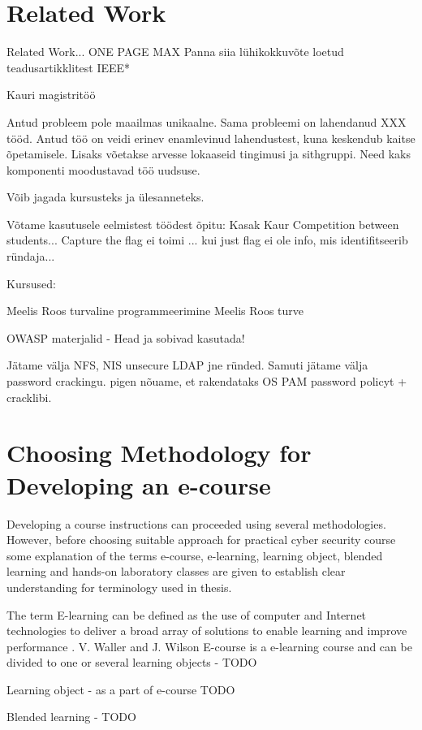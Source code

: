\section{Related Work}
\label{Related Work}
Related Work...
ONE PAGE MAX
Panna siia lühikokkuvõte loetud teadusartikklitest IEEE*

Kauri magistritöö

Antud probleem pole maailmas unikaalne. Sama probleemi on lahendanud XXX tööd. Antud töö on veidi erinev enamlevinud lahendustest, kuna keskendub kaitse õpetamisele. Lisaks võetakse arvesse lokaaseid tingimusi ja sithgruppi. Need kaks komponenti moodustavad töö uudsuse.

Võib jagada kursusteks ja ülesanneteks.

Võtame kasutusele eelmistest töödest õpitu:
Kasak Kaur \citep{KasakKaur}
Competition between students...
Capture the flag ei toimi ... kui just flag ei ole info, mis identifitseerib ründaja...

Kursused:

Meelis Roos turvaline programmeerimine
Meelis Roos turve 

OWASP materjalid - Head ja sobivad kasutada!

Jätame välja NFS, NIS unsecure LDAP jne ründed.
Samuti jätame välja password crackingu. pigen nõuame, et rakendataks OS PAM password policyt + cracklibi.


\section{Choosing Methodology for Developing an e-course}

Developing a course instructions can proceeded using several methodologies. However, before choosing suitable approach for practical cyber security course some explanation of the terms e-course, e-learning, learning object, blended learning and hands-on laboratory classes are given to establish clear understanding for terminology used in thesis.

The term E-learning can be defined as the use of computer and Internet technologies to deliver a broad array of solutions to enable learning and improve performance \cite[p.~3]{food2011learning}.
V. Waller and J. Wilson 
E-course is a e-learning course and can be divided to one or several learning objects - {\color{red} TODO }

Learning object -  as a part of \gls{e-course} {\color{red} TODO }

Blended learning - {\color{red} TODO }

